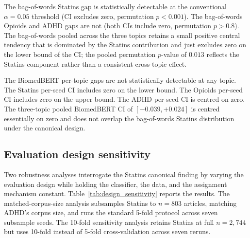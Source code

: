 \documentclass[11pt,a4paper]{article}
\begin{document}
The bag-of-words Statins gap is statistically detectable at the conventional $\alpha = 0.05$ threshold (CI excludes zero, permutation $p < 0.001$). The bag-of-words Opioids and ADHD gaps are not (both CIs include zero, permutation $p > 0.8$). The bag-of-words pooled across the three topics retains a small positive central tendency that is dominated by the Statins contribution and just excludes zero on the lower bound of the CI; the pooled permutation $p$-value of $0.013$ reflects the Statins component rather than a consistent cross-topic effect.

The BiomedBERT per-topic gaps are not statistically detectable at any topic. The Statins per-seed CI includes zero on the lower bound. The Opioids per-seed CI includes zero on the upper bound. The ADHD per-seed CI is centred on zero. The three-topic pooled BiomedBERT CI of $[-0.039, +0.024]$ is centred essentially on zero and does not overlap the bag-of-words Statins distribution under the canonical design.

\subsection{Evaluation design sensitivity}

Two robustness analyses interrogate the Statins canonical finding by varying the evaluation design while holding the classifier, the data, and the assignment mechanism constant. Table~\ref{tab:design_sensitivity} reports the results. The matched-corpus-size analysis subsamples Statins to $n = 803$ articles, matching ADHD's corpus size, and runs the standard 5-fold protocol across seven subsample seeds. The 10-fold sensitivity analysis retains Statins at full $n = 2{,}744$ but uses 10-fold instead of 5-fold cross-validation across seven reruns.
\end{document}
